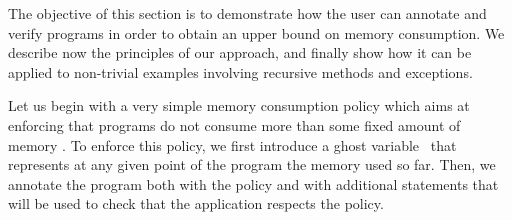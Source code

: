 The objective of this section is to demonstrate how the user can
annotate and verify programs in order to obtain an upper bound on
memory consumption. 
We describe now the principles of our
approach, and finally show
how it can be applied to non-trivial examples involving recursive
methods and exceptions.

Let us begin with a very simple memory consumption policy which aims
at enforcing that  programs do not consume more than
some fixed amount of memory \Max . To enforce this policy, we first
introduce a ghost variable \Mem\ that represents at any given point of
the program the memory used so far. Then, we annotate the program both
with the policy and with additional statements that will be used to
check that the application respects the policy.


